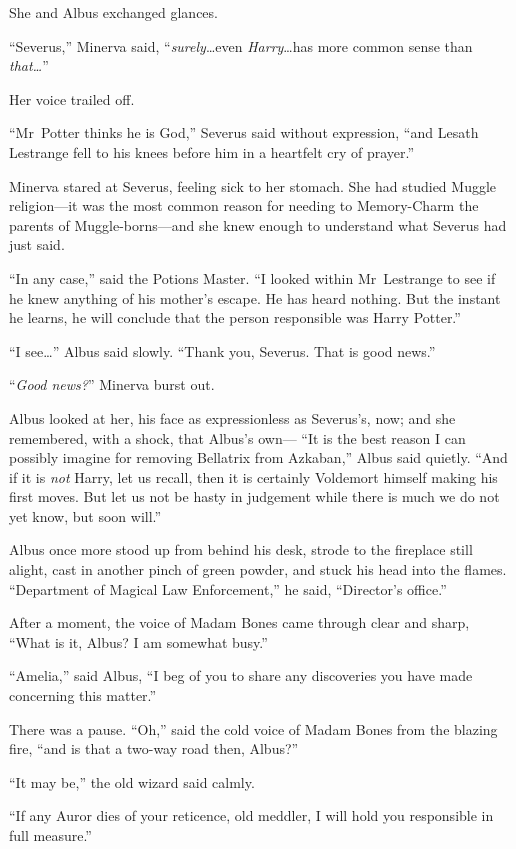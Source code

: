 She and Albus exchanged glances.

“Severus,” Minerva said, “\emph{surely}…even \emph{Harry}…has more common sense than \emph{that…}”

Her voice trailed off.

“Mr~Potter thinks he is God,” Severus said without expression, “and Lesath Lestrange fell to his knees before him in a heartfelt cry of prayer.”

Minerva stared at Severus, feeling sick to her stomach. She had studied Muggle religion—it was the most common reason for needing to Memory-Charm the parents of Muggle-borns—and she knew enough to understand what Severus had just said.

“In any case,” said the Potions Master. “I looked within Mr~Lestrange to see if he knew anything of his mother’s escape. He has heard nothing. But the instant he learns, he will conclude that the person responsible was Harry Potter.”

“I see…” Albus said slowly. “Thank you, Severus. That is good news.”

“\emph{Good news?}” Minerva burst out.

Albus looked at her, his face as expressionless as Severus’s, now; and she remembered, with a shock, that Albus’s own— “It is the best reason I can possibly imagine for removing Bellatrix from Azkaban,” Albus said quietly. “And if it is \emph{not} Harry, let us recall, then it is certainly Voldemort himself making his first moves. But let us not be hasty in judgement while there is much we do not yet know, but soon will.”

Albus once more stood up from behind his desk, strode to the fireplace still alight, cast in another pinch of green powder, and stuck his head into the flames. “Department of Magical Law Enforcement,” he said, “Director’s office.”

After a moment, the voice of Madam Bones came through clear and sharp, “What is it, Albus? I am somewhat busy.”

“Amelia,” said Albus, “I beg of you to share any discoveries you have made concerning this matter.”

There was a pause. “Oh,” said the cold voice of Madam Bones from the blazing fire, “and is that a two-way road then, Albus?”

“It may be,” the old wizard said calmly.

“If any Auror dies of your reticence, old meddler, I will hold you responsible in full measure.”

